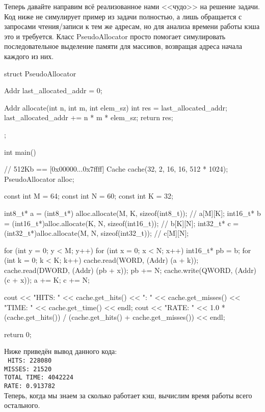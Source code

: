 \documentclass[14pt, russian, onesize]{extreport}
\begin{document}
Теперь давайте направим всё реализованное нами <<чудо>> на решение задачи.
Код ниже не симулирует пример из задачи полностью, а лишь обращается
с запросами чтения\slash записи
к тем же адресам, но для анализа времени работы кэша это и требуется.
Класс PseudoAllocator просто помогает симулировать
последовательное выделение памяти для массивов, возвращая 
адреса начала каждого из них.

\begin{cppcode}
struct PseudoAllocator {
    Addr last_allocated_addr = 0;
    
    Addr allocate(int n, int m, int elem_sz) {
        int res = last_allocated_addr;
        last_allocated_addr += n * m * elem_sz;
        return res;
    }
};

int main() {
    // 512Kb == [0x00000...0x7ffff]
    Cache cache(32, 2, 16, 16, 512 * 1024);
    PseudoAllocator alloc;

    const int M = 64;
    const int N = 60;
    const int K = 32;

    int8_t*  a = (int8_t*) alloc.allocate(M, K, sizeof(int8_t));  // a[M][K];
    int16_t* b = (int16_t*)alloc.allocate(K, N, sizeof(int16_t)); // b[K][N];
    int32_t* c = (int32_t*)alloc.allocate(M, N, sizeof(int32_t)); // c[M][N];

    for (int y = 0; y < M; y++) {
        for (int x = 0; x < N; x++) {
            int16_t* pb = b;
            for (int k = 0; k < K; k++) {
                cache.read(WORD, (Addr) (a + k));
                cache.read(DWORD, (Addr) (pb + x));
                pb += N;
            }
            cache.write(QWORD, (Addr) (c + x));
        }
        a += K;
        c += N;
    }

    cout << "HITS: " << cache.get_hits() << "\nMISSES: " << cache.get_misses() << "\nTOTAL TIME: " << cache.get_time() << endl;
    cout << "RATE: " << 1.0 * (cache.get_hits()) / (cache.get_hits() + cache.get_misses()) << endl;

    return 0;
}
\end{cppcode}
Ниже приведён вывод данного кода:\\
\texttt{
HITS: 228080 \\
MISSES: 21520 \\
TOTAL TIME: 4042224\\
RATE: 0.913782\\
}
Теперь, когда мы знаем за сколько работает кэш, вычислим время
работы всего остального. 
\end{document}
